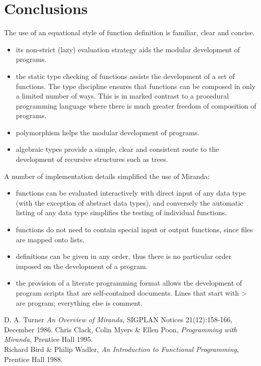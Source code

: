 \documentclass[11pt]{article}
\begin{document}
\section{Conclusions}

The use of an equational style of function definition is familiar, clear and concise.
\begin{itemize}
    \item its non-strict (lazy) evaluation strategy aids the modular development of programs.

\item the static type checking of functions assists the development of a set of functions.
The type discipline ensures that functions can be composed in only a limited
number of ways. This is in marked contrast to a procedural programming language
where there is much greater freedom of composition of programs.
\item polymorphism helps the modular development of programs.
\item algebraic types provide a simple, clear and consistent route to the development of
recursive structures such as trees.
\end{itemize}

A number of implementation details
simplified the use of Miranda:
\begin{itemize}
\item functions can be evaluated interactively with direct input of any data type (with the
exception of abstract data types), and conversely the automatic listing of any data
type simplifies the testing of individual functions.
\item functions do not need to contain special input or output functions, since files are
mapped onto lists.
\item definitions can be given in any order, thus there is no particular order imposed on
the development of a program.
\item the provision of a literate programming format allows the development of program
scripts that are self-contained documents. Lines that start with > are program;
everything else is comment.
\end{itemize}
\medskip

 
D. A. Turner \textit{An Overview of Miranda}, SIGPLAN Notices 21(12):158-166, December 1986. 
Chris Clack, Colin Myers & Ellen Poon, \textit{Programming with Miranda}, Prentice Hall 1995. \\
Richard Bird & Philip Wadler, \textit{An Introduction to Functional Programming}, Prentice Hall 1988.\\
\newpage
\end{document}
